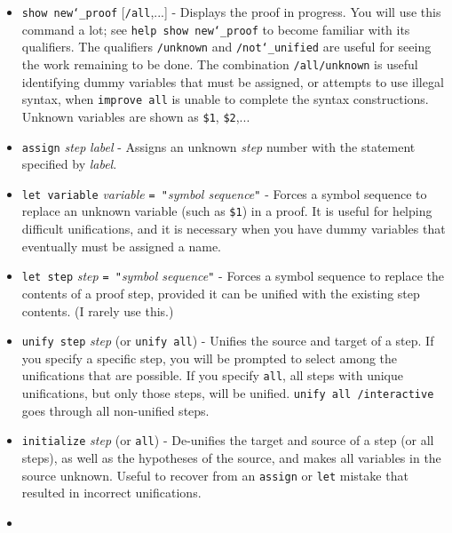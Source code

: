 \begin{itemize}
\item[]
    \texttt{show new{\char`\_}proof} [\texttt{/all},...] - Displays the
        proof in progress.  You will use this command a lot; see \texttt{help
        show new{\char`\_}proof} to become familiar with its qualifiers.  The
        qualifiers \texttt{/unknown} and \texttt{/not{\char`\_}unified} are
        useful for seeing the work remaining to be done.  The combination
        \texttt{/all/unknown} is useful identifying dummy variables that must be
        assigned, or attempts to use illegal syntax, when \texttt{improve all}
        is unable to complete the syntax constructions.  Unknown variables are
        shown as \texttt{\$1}, \texttt{\$2},...
\item[]
    \texttt{assign} {\em step} {\em label} - Assigns an unknown {\em step}
        number with the statement
        specified by {\em label}.
\item[]
    \texttt{let variable} {\em variable}
        \texttt{= "}{\em symbol sequence}\texttt{"}
          - Forces a symbol
        sequence to replace an unknown variable (such as \texttt{\$1}) in a proof.
        It is useful
        for helping difficult unifications, and it is necessary when you have
        dummy variables that eventually must be assigned a name.
\item[]
    \texttt{let step} {\em step} \texttt{= "}{\em symbol sequence}\texttt{"} -
          Forces a symbol sequence
        to replace the contents of a proof step, provided it can be
        unified with the existing step contents.  (I rarely use this.)
\item[]
    \texttt{unify step} {\em step} (or \texttt{unify all}) - Unifies
        the source and target of
        a step.  If you specify a specific step, you will be prompted
        to select among the unifications that are possible.  If you
        specify \texttt{all}, all steps with unique unifications, but only
        those steps, will be
        unified.  \texttt{unify all /interactive} goes through all non-unified
        steps.
\item[]
    \texttt{initialize} {\em step} (or \texttt{all}) - De-unifies the target and source of
        a step (or all steps), as well as the hypotheses of the source,
        and makes all variables in the source unknown.  Useful to recover from
        an \texttt{assign} or \texttt{let} mistake that
        resulted in incorrect unifications.
\item[]

\end{itemize}
